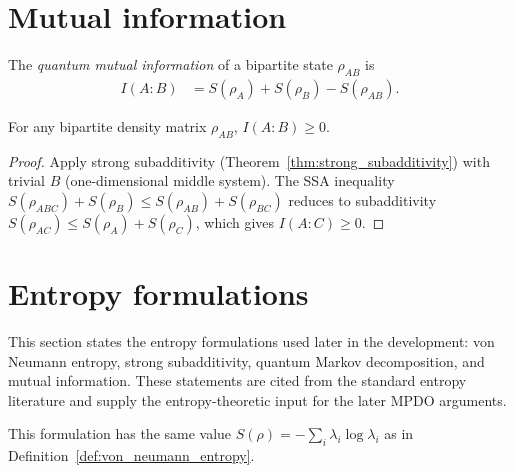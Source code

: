 \section{Mutual information}

\begin{definition}\label{def:mutual_information}
    \leanok
    The \emph{quantum mutual information} of a bipartite state
    $\rho_{AB}$ is
    \begin{align}
        I(A{:}B)
        &= S(\rho_A) + S(\rho_B) - S(\rho_{AB}).
        \label{eq:entropy_mutual_information}
    \end{align}
\end{definition}

\begin{theorem}\label{thm:mutual_information_nonneg}
    \leanok
    For any bipartite density matrix $\rho_{AB}$,
    $I(A{:}B) \ge 0$.
\end{theorem}

\begin{proof}\leanok
    Apply strong subadditivity (Theorem~\ref{thm:strong_subadditivity})
    with trivial $B$ (one-dimensional middle system).
    The SSA inequality $S(\rho_{ABC}) + S(\rho_B) \le S(\rho_{AB}) + S(\rho_{BC})$
    reduces to subadditivity $S(\rho_{AC}) \le S(\rho_A) + S(\rho_C)$,
    which gives $I(A{:}C) \ge 0$.
\end{proof}

\section{Entropy formulations}

This section states the entropy formulations used later in the
development: von Neumann entropy, strong subadditivity, quantum Markov
decomposition, and mutual information. These statements are cited from the
standard entropy literature and supply the entropy-theoretic input for the
later MPDO arguments.

\begin{definition}
    \label{def:entropy_von_neumann_entropy}
    \leanok
    This formulation has the same value
    $S(\rho) = -\sum_i \lambda_i \log \lambda_i$ as in
    Definition~\ref{def:von_neumann_entropy}.
\end{definition}

